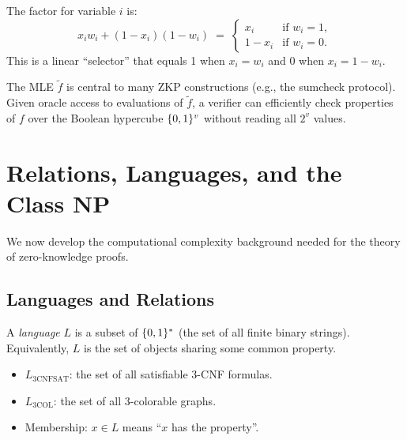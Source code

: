 \documentclass[11pt]{article}
\begin{document}
\begin{remark}
The factor for variable $i$ is:
\[
  x_i w_i + (1-x_i)(1-w_i)
  \;=\;
  \begin{cases}
    x_i & \text{if } w_i = 1, \\
    1 - x_i & \text{if } w_i = 0.
  \end{cases}
\]
This is a linear ``selector'' that equals 1 when $x_i = w_i$ and 0 when $x_i = 1 - w_i$.
\end{remark}

\begin{remark}
The MLE $\widetilde{f}$ is central to many ZKP constructions (e.g., the sumcheck protocol).
Given oracle access to evaluations of $\widetilde{f}$, a verifier can efficiently check
properties of $f$ over the Boolean hypercube $\{0,1\}^v$ without reading all $2^v$ values.
\end{remark}

\section{Relations, Languages, and the Class NP}

We now develop the computational complexity background needed for the theory of
zero-knowledge proofs.

\subsection{Languages and Relations}

\begin{tcolorbox}[colback=blue!5!white, colframe=blue!50!black, title=Languages]
\begin{definition}[Language]
A \emph{language} $L$ is a subset of $\{0,1\}^*$ (the set of all finite binary strings).
Equivalently, $L$ is the set of objects sharing some common property.
\end{definition}
\end{tcolorbox}

\begin{example}[Languages]
\hfill
\begin{itemize}
  \item $L_{\mathrm{3CNFSAT}}$: the set of all satisfiable 3-CNF formulas.
  \item $L_{\mathrm{3COL}}$: the set of all 3-colorable graphs.
  \item Membership: $x \in L$ means ``$x$ has the property''.
\end{itemize}
\end{example}
\end{document}
